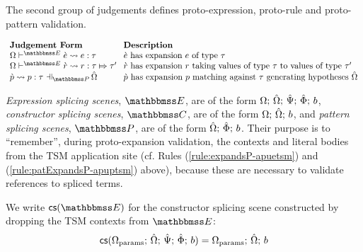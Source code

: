 The second group of judgements defines proto-expression, proto-rule and proto-pattern validation.

\vspace{10px}\noindent
$\arraycolsep=4pt\begin{array}{ll}
\textbf{Judgement Form} & \textbf{Description}\\
\cvalidEPX{\ce}{e}{\tau} & \text{$\ce$ has expansion $e$ of type $\tau$}\\
\cvalidRP{\Omega}{\escenev}{\crv}{r}{\tau}{\tau'} & \text{$\crv$ has expansion $r$ taking values of type $\tau$ to values of type $\tau'$}\\
\cvalidPPE{\uOmega}{\pscenev}{\cpv}{p}{\tau} & \text{$\cpv$ has expansion $p$ matching against $\tau$ generating hypotheses $\uOmega$}
\end{array}$
\vspace{10px}

\emph{Expression splicing scenes}, $\escenev$, are of the form $\Omega;\,{\hat\Omega};\,\hat{\Psi};\,\hat\Phi;\,b$, \emph{constructor splicing scenes}, $\cscenev$, are of the form $\Omega;\,{\hat\Omega};\,b$, and \emph{pattern splicing scenes}, $\pscenev$, are of the form ${\hat\Omega};\,\hat\Phi;\,b$. Their purpose is to ``remember'', during proto-expansion validation, the contexts and literal bodies from the TSM application site (cf. Rules (\ref{rule:expandsP-apuetsm}) and (\ref{rule:patExpandsP-apuptsm}) above), because these are necessary to validate references to spliced terms.

We write $\csfrom{\escenev}$ for the constructor splicing scene constructed by dropping the TSM contexts from $\escenev$:
\[\mathsf{cs}(\Omega_\text{params};\,{\hat\Omega};\,\hat{\Psi};\,\hat\Phi;\,b) = \Omega_\text{params};\,{\hat\Omega};\,b\]


